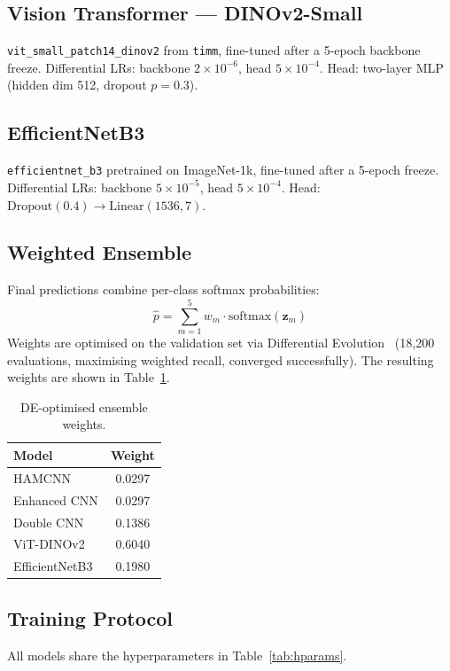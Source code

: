 \documentclass[10pt,twocolumn]{article}
\begin{document}
\subsection{Vision Transformer — DINOv2-Small}
\texttt{vit\_small\_patch14\_dinov2} from \texttt{timm}, fine-tuned after a 5-epoch backbone freeze. Differential LRs: backbone $2\times10^{-6}$, head $5\times10^{-4}$. Head: two-layer MLP (hidden dim 512, dropout $p=0.3$).

\subsection{EfficientNetB3}
\texttt{efficientnet\_b3} pretrained on ImageNet-1k, fine-tuned after a 5-epoch freeze. Differential LRs: backbone $5\times10^{-5}$, head $5\times10^{-4}$. Head: $\mathrm{Dropout}(0.4)\to\mathrm{Linear}(1536,7)$.

\subsection{Weighted Ensemble}
Final predictions combine per-class softmax probabilities:
\begin{equation}
  \hat{p} = \sum_{m=1}^{5} w_m \cdot \mathrm{softmax}(\mathbf{z}_m)
\end{equation}
Weights are optimised on the validation set via Differential Evolution~\cite{storn1997differential} (18,200 evaluations, maximising weighted recall, converged successfully). The resulting weights are shown in Table~\ref{tab:ensemble_weights}.

\begin{table}[ht]
\centering
\small
\caption{DE-optimised ensemble weights.}
\label{tab:ensemble_weights}
\begin{tabular}{lc}
\toprule
\textbf{Model} & \textbf{Weight} \\
\midrule
HAMCNN         & 0.0297 \\
Enhanced CNN   & 0.0297 \\
Double CNN     & 0.1386 \\
ViT-DINOv2     & 0.6040 \\
EfficientNetB3 & 0.1980 \\
\bottomrule
\end{tabular}
\end{table}

\subsection{Training Protocol}
All models share the hyperparameters in Table~\ref{tab:hparams}.
\end{document}
